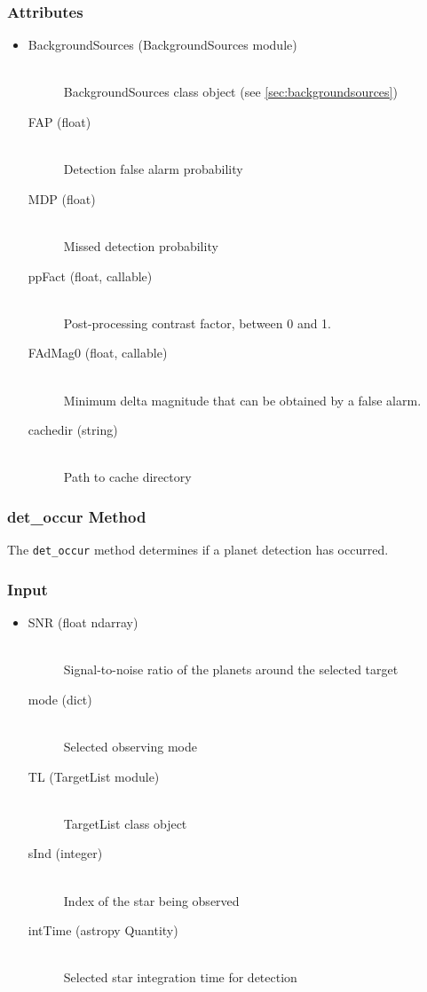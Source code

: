 \documentclass[cleanfoot]{asme2ej}
\begin{document}
\subsubsection*{Attributes}
\begin{itemize}
\item 
\begin{description}
    \item[BackgroundSources (BackgroundSources module)] \hfill \\
        BackgroundSources class object (see \ref{sec:backgroundsources})
    \item[FAP (float)] \hfill \\ Detection false alarm probability
    \item[MDP (float)] \hfill \\ Missed detection probability
    \item[ppFact (float, callable)] \hfill \\ Post-processing contrast factor, between 0 and 1.
    \item[FAdMag0 (float, callable)] \hfill \\ Minimum delta magnitude that can be obtained by a false alarm.
    \item[cachedir (string)] \hfill \\ Path to cache directory
\end{description}
\end{itemize}

\subsubsection{det\_occur Method} \label{sec:detoccurtask}
The \verb+det_occur+ method determines if a planet detection has occurred.

\subsubsection*{Input}
\begin{itemize}
\item 
\begin{description}
    \item[SNR (float ndarray)] \hfill \\ Signal-to-noise ratio of the planets around the selected target
    \item[mode (dict)] \hfill \\ Selected observing mode
    \item[TL (TargetList module)] \hfill \\ TargetList class object
    \item[sInd (integer)] \hfill \\ Index of the star being observed
    \item[intTime (astropy Quantity)] \hfill \\ Selected star integration time for detection
\end{description}
\end{itemize}
\end{document}
